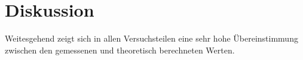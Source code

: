 \section{Diskussion}
\label{sec:Diskussion}

Weitesgehend zeigt sich in allen Versuchsteilen eine sehr hohe Übereinstimmung zwischen den gemessenen
und theoretisch berechneten Werten.